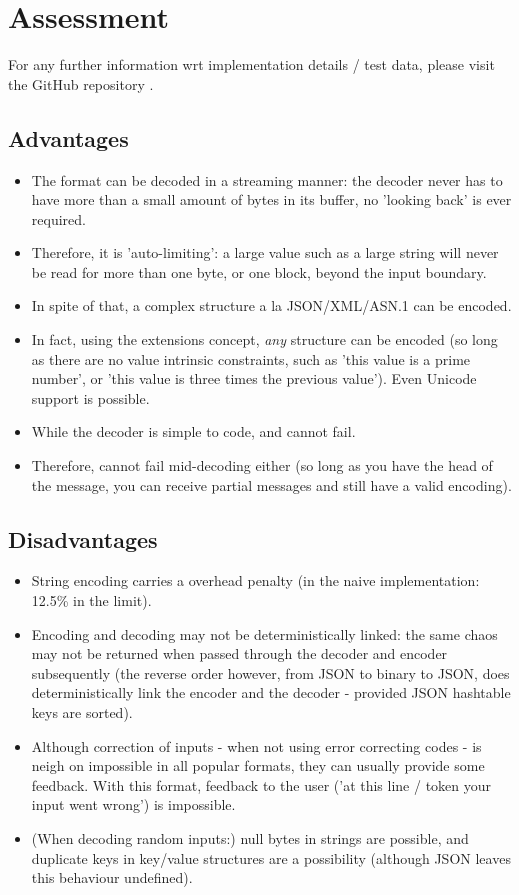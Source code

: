 \section{Assessment}

For any further information wrt implementation details / test data, please
visit the GitHub repository \cite{bib:sarthaka}.

\subsection{Advantages}

\begin{itemize}
\item The format can be decoded in a streaming manner: the decoder never
      has to have
      more than a small amount of bytes in its buffer, no 'looking back' is
      ever required.
\item Therefore, it is 'auto-limiting': a large value such as a large string
      will never be read for more than one byte, or one block, beyond the
      input boundary.
\item In spite of that, a complex structure a la JSON/XML/ASN.1 can be
      encoded.
\item In fact, using the extensions concept, \textit{any} structure can
      be encoded (so long as there are no value intrinsic constraints, such
      as 'this value is a prime number', or 'this value is three times the
      previous value'). Even Unicode support is possible.
\item While the decoder is simple to code, and cannot fail.
\item Therefore, cannot fail mid-decoding either (so long as you have the
      head of the message, you can receive
      partial messages and still have a valid encoding).
\end{itemize}

\subsection{Disadvantages}

\begin{itemize}
\item String encoding carries a overhead penalty
      (in the naive implementation: 12.5\% in the limit).
\item Encoding and decoding may not be deterministically linked: the same
      chaos may not be returned when passed through the decoder and encoder
      subsequently (the reverse order however, from JSON to binary to JSON,
      does deterministically link the encoder and the decoder - provided
      JSON hashtable keys are sorted).
\item Although correction of inputs - when not using error correcting codes -
      is neigh on impossible in all popular formats, they can usually
      provide some feedback. With this format, feedback to the user
      ('at this line / token your input went wrong') is impossible.
\item (When decoding random inputs:) null bytes in strings are possible,
      and duplicate
      keys in key/value structures are a possibility (although JSON
      leaves this behaviour undefined).
\end{itemize}
